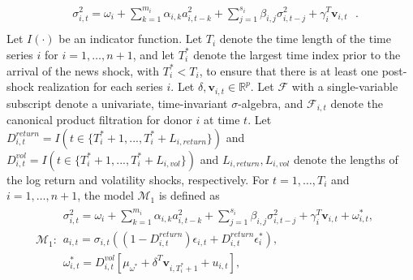 \documentclass[11pt,3p,review,authoryear]{elsarticle}
\newcommand{\x}{\textbf{v}}
\def\mc#1{\mathcal{#1}} %
\def\mc#1{\mathcal{#1}}
\theoremstyle{definition}
\begin{document}
\begin{align*}
&\sigma_{i,t}^{2} = \omega_{i} + \sum^{m_{i}}_{k=1}\alpha_{i,k}a^{2}_{i,t-k} + \sum_{j=1}^{s_{i}}\beta_{i,j}\sigma_{i,t-j}^{2} + \gamma_{i}^{T} \x_{i,t} \text{ }. \\
\end{align*}
Let $I(\cdot)$ be an indicator function.  Let $T_i$ denote the time length of the time series $i$ for $i = 1, \ldots, n+1$, and let $T_i^*$ denote the largest time index prior to the arrival of the news shock, with $T_i^* < T_i$, to ensure that there is at least one post-shock realization for each series $i$.  Let $\delta, \x_{i,t} \in \mathbb{R}^{p}$.  Let $\mathcal{F}$ with a single-variable subscript denote a univariate, time-invariant $\sigma$-algebra, and $\mathcal{F}_{i,t}$ denote the canonical product filtration for donor $i$ at time $t$.  Let $D^{return}_{i,t} = I(t \in \{T_i^* + 1,...,T_i^* + L_{i, return}\})$ and $D^{vol}_{i,t} = I(t \in \{T_i^* + 1,...,T_i^* + L_{i, vol}\})$ and $L_{i,return},L_{i,vol}$ denote the lengths of the log return and volatility shocks, respectively.  For $t= 1, \ldots, T_i$ and $i = 1, \ldots, n+1$, the model $\mc{M}_1$ is defined as 
\begin{align*}
  \mc{M}_1 \colon \begin{array}{l}
     \sigma^{2}_{i,t} = \omega_{i} + \sum^{m_{i}}_{k=1}\alpha_{i,k}a^{2}_{i,t-k} + \sum_{j=1}^{s_{i}}\beta_{i,j}\sigma_{i,t-j}^{2} + \gamma_{i}^{T} \x_{i,t} + \omega^{*}_{i,t}, \text{ }\\[.2cm]
     a_{i,t} = \sigma_{i,t}((1-D^{return}_{i,t})\epsilon_{i,t} + D^{return}_{i,t}\epsilon^{*}_{i}),\\[.2cm]
    \omega_{i,t}^{*} = D^{vol}_{i,t}[\mu_{\omega^{*}}+\delta^{T}\x_{i,T^{*}_{i}+1}+ u_{i,t}],
  \end{array}
  \end{align*}
\end{document}
